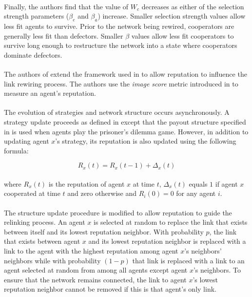 \documentclass{article}
\begin{document}
	\paragraph{}Finally, the authors find that the value of $W_c$ decreases as either of the selection strength parameters ($\beta_e$ and $\beta_a$) increase.  Smaller selection strength values allow less fit agents to survive.  Prior to the network being rewired, cooperators are generally less fit than defectors.  Smaller $\beta$ values allow less fit cooperators to survive long enough to restructure the network into a state where cooperators dominate defectors.
	\paragraph{}The authors of \cite{Fu2008} extend the framework used in \cite{Santos2006d} to allow reputation to influence the link rewiring process.  The authors use the \textit{image score} metric introduced in \cite{Nowak1998} to measure an agent's reputation.
	\paragraph{}The evolution of strategies and network structure occurs asynchronously.  A strategy update proceeds as defined in \cite{Santos2006d} except that the payout structure specified in \cite{Nowak1992} is used when agents play the prisoner's dilemma game.  However, in addition to updating agent $x$'s strategy, its reputation is also updated using the following formula:
	
	\begin{equation}
	R_x(t)=R_x(t-1)+\Delta_x(t)
	\end{equation}

	\paragraph{}where $R_x(t)$ is the reputation of agent $x$ at time $t$, $\Delta_x(t)$ equals $1$ if agent $x$ cooperated at time $t$ and zero otherwise and $R_i(0)=0$ for any agent $i$.
	\paragraph{}The structure update procedure is modified to allow reputation to guide the relinking process.  An agent $x$ is selected at random to replace the link that exists between itself and its lowest reputation neighbor.  With probability $p$, the link that exists between agent $x$ and its lowest reputation neighbor is replaced with a link to the agent with the highest reputation among agent $x$'s neighbors' neighbors while with probability $(1-p)$ that link is replaced with a link to an agent selected at random from among all agents except agent $x$'s neighbors.  To ensure that the network remains connected, the link to agent $x$'s lowest reputation neighbor cannot be removed if this is that agent's only link.
\end{document}

